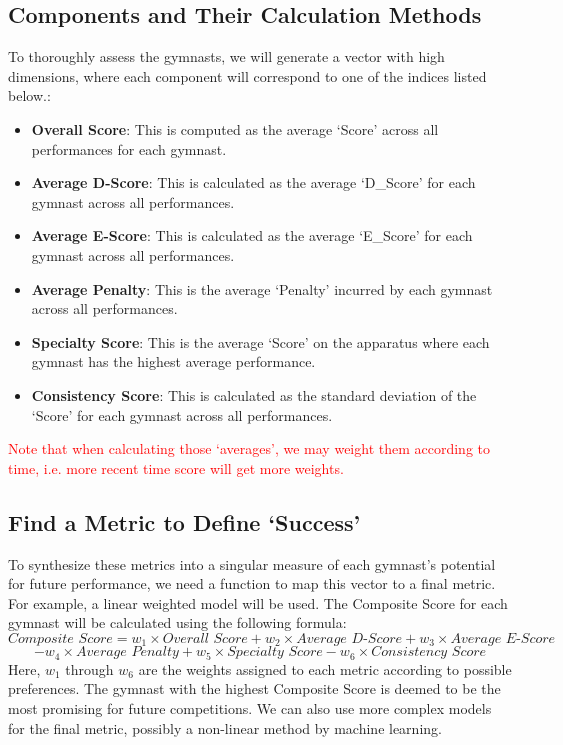 \documentclass[11pt]{article}
\begin{document}
\subsection{Components and Their Calculation Methods}
To thoroughly assess the gymnasts, we will generate a vector with high dimensions, where each component will correspond to one of the indices listed below.:
    \begin{itemize}
        \item \textbf{Overall Score}: This is computed as the average `Score' across all performances for each gymnast.
        \item \textbf{Average D-Score}: This is calculated as the average `D\_Score' for each gymnast across all performances.
        \item \textbf{Average E-Score}: This is calculated as the average `E\_Score' for each gymnast across all performances.
        \item \textbf{Average Penalty}: This is the average `Penalty' incurred by each gymnast across all performances.
        \item \textbf{Specialty Score}: This is the average `Score' on the apparatus where each gymnast has the highest average performance.
        \item \textbf{Consistency Score}: This is calculated as the standard deviation of the `Score' for each gymnast across all performances.
    \end{itemize}
\textcolor{red}{Note that when calculating those `averages', we may weight them according to time, i.e. more recent time score will get more weights.}
\subsection{Find a Metric to Define `Success'}
    To synthesize these metrics into a singular measure of each gymnast's potential for future performance, we need a function to map this vector to a final metric. For example, a linear weighted model will be used. The Composite Score for each gymnast will be calculated using the following formula:
    \[
    \textit{Composite Score} = w_1 \times \textit{Overall Score} + w_2 \times \textit{Average D-Score} + w_3 \times \textit{Average E-Score}\]\[ - w_4 \times \textit{Average Penalty} + w_5 \times \textit{Specialty Score} - w_6 \times \textit{Consistency Score}
    \]
    Here, \( w_1 \) through \( w_6 \) are the weights assigned to each metric according to possible preferences. The gymnast with the highest Composite Score is deemed to be the most promising for future competitions. We can also use more complex models for the final metric, possibly a non-linear method by machine learning.
\end{document}
